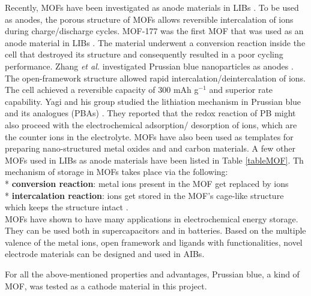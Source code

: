 Recently, MOFs have been investigated as anode materials in LIBs \cite{li_shape-controlled_2006,han_synthesis_2012,zhao_metalorganic_2015}. To be used as anodes, the porous structure of MOFs allows reversible intercalation of  ions during charge/discharge cycles. MOF-177 was the first MOF that was used as an anode material in LIBs \cite{}. The material underwent a conversion reaction inside the cell that destroyed its structure and consequently resulted in a poor cycling performance.  Zhang \textit{et al.} investigated Prussian blue nanoparticles as anodes \cite{nie_prussian_2014}. The open-framework structure allowed rapid intercalation/deintercalation of  ions. The cell achieved a reversible capacity of 300 mAh g$^{-1}$ and superior rate capability. Yagi and his group studied the lithiation mechanism in Prussian blue and its analogues (PBAs) \cite{yagi_eqcm_2014}. They reported that the redox reaction of PB might also proceed with the electrochemical adsorption/ desorption of  ions, which are the counter ions in the electrolyte. MOFs have also been used as templates for preparing nano-structured metal oxides and and carbon materials. A few other MOFs used in LIBs as anode materials have been listed in Table \ref{tableMOF}. Th mechanism of  storage in MOFs takes place via the following: \\*
\textbf{conversion reaction}: metal ions present in the MOF get replaced by  ions \\*
\textbf{intercalation reaction}:  ions get stored in the MOF's cage-like structure which keeps the structure intact \cite{wang_metalorganic_2016}. \\
MOFs have shown to have many applications in electrochemical energy storage. They can be used both in supercapacitors and in batteries. Based on the multiple valence of the metal ions, open framework and ligands with functionalities, novel electrode materials can be designed and used in AIBs. 

For all the above-mentioned properties and advantages, Prussian blue, a kind of MOF, was tested as a cathode material in this project. 

